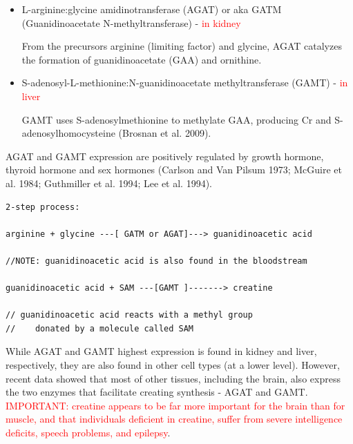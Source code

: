 \begin{itemize}
  \item L-arginine:glycine amidinotransferase (AGAT) or aka GATM
  (Guanidinoacetate N-methyltransferase) - \textcolor{red}{in kidney}

From the precursors arginine (limiting factor) and glycine, AGAT
catalyzes the formation of guanidinoacetate (GAA) and ornithine.


  \item S-adenosyl-L-methionine:N-guanidinoacetate methyltransferase (GAMT) -
  \textcolor{red}{in liver}

GAMT  uses S-adenosylmethionine to methylate GAA, producing Cr and
S-adenosylhomocysteine (Brosnan et al. 2009).
\end{itemize}
AGAT and GAMT expression are positively regulated by growth hormone, thyroid
hormone and sex hormones (Carlson and Van Pilsum 1973; McGuire et al. 1984;
Guthmiller et al. 1994; Lee et al.
1994).

\begin{verbatim}
2-step process:

arginine + glycine ---[ GATM or AGAT]---> guanidinoacetic acid

//NOTE: guanidinoacetic acid is also found in the bloodstream

guanidinoacetic acid + SAM ---[GAMT ]-------> creatine

// guanidinoacetic acid reacts with a methyl group
//    donated by a molecule called SAM
\end{verbatim}

While AGAT and GAMT highest expression is found in kidney and liver,
respectively, they are also found in other cell types (at a lower level).
However, recent data showed that most of other tissues, including the brain,
also express the two enzymes that facilitate creating synthesis - AGAT and GAMT.
\textcolor{red}{IMPORTANT: creatine appears to be far more important for the
brain than for muscle, and that individuals deficient in creatine, suffer from
severe intelligence deficits, speech problems, and epilepsy}.

